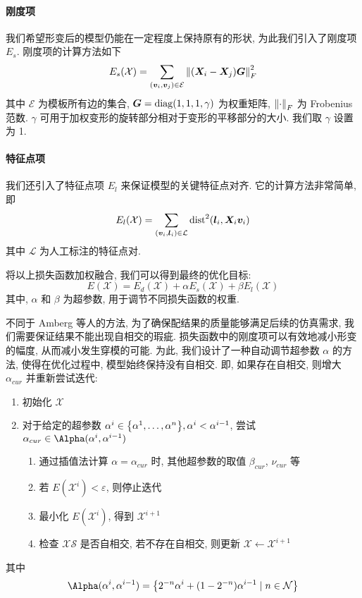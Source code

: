\paragraph{刚度项}
我们希望形变后的模型仍能在一定程度上保持原有的形状, 为此我们引入了刚度项 $E_s$. 刚度项的计算方法如下
\begin{equation}
  E_s(\mathcal{X}) = \sum_{(\bm{v}_i, \bm{v}_j) \in \mathcal{E}} \norm{(\bm{X}_i - \bm{X}_j) \bm{G}}_F^2
\end{equation}
其中 $\mathcal{E}$ 为模板所有边的集合, $\bm{G} = \operatorname{diag}(1, 1, 1, \gamma)$ 为权重矩阵, $\norm{\cdot}_F$ 为 Frobenius 范数.
$\gamma$ 可用于加权变形的旋转部分相对于变形的平移部分的大小.
我们取 $\gamma$ 设置为 1.

\paragraph{特征点项}
我们还引入了特征点项 $E_l$ 来保证模型的关键特征点对齐.
它的计算方法非常简单, 即
\begin{equation}
  E_l(\mathcal{X}) = \sum_{(\bm{v}_i, \bm{l}_i) \in \mathcal{L}} \operatorname{dist}^2(\bm{l}_i, \bm{X}_i \bm{v}_i)
\end{equation}
其中 $\mathcal{L}$ 为人工标注的特征点对.

将以上损失函数加权融合, 我们可以得到最终的优化目标:
\begin{equation}
  E(\mathcal{X}) = E_d(\mathcal{X}) + \alpha E_s(\mathcal{X}) + \beta E_l(\mathcal{X})
\end{equation}
其中, $\alpha$ 和 $\beta$ 为超参数, 用于调节不同损失函数的权重.

不同于 Amberg 等人的方法, 为了确保配结果的质量能够满足后续的仿真需求, 我们需要保证结果不能出现自相交的瑕疵.
损失函数中的刚度项可以有效地减小形变的幅度, 从而减小发生穿模的可能.
为此, 我们设计了一种自动调节超参数 $\alpha$ 的方法, 使得在优化过程中, 模型始终保持没有自相交.
即, 如果存在自相交, 则增大 $\alpha_{cur}$ 并重新尝试迭代:
\begin{enumerate}
  \item 初始化 $\mathcal{X}$
  \item 对于给定的超参数 $\alpha^i \in \Bqty{\alpha^1, \dots, \alpha^n}, \alpha^i < \alpha^{i - 1}$, 尝试 $\alpha_{cur} \in \Alpha(\alpha^i, \alpha^{i - 1})$
        \begin{enumerate}
          \item 通过插值法计算 $\alpha = \alpha_{cur}$ 时, 其他超参数的取值 $\beta_{cur}$, $\nu_{cur}$ 等
          \item 若 $E(\mathcal{X}^i) < \varepsilon$, 则停止迭代
          \item 最小化 $E(\mathcal{X}^i)$, 得到 $\mathcal{X}^{i + 1}$
          \item 检查 $\mathcal{X} \mathcal{S}$ 是否自相交, 若不存在自相交, 则更新 $\mathcal{X} \leftarrow \mathcal{X}^{i + 1}$
        \end{enumerate}
\end{enumerate}
其中
\begin{equation}
  \Alpha(\alpha^i, \alpha^{i - 1}) = \Bqty{2^{-n} \alpha^i + (1 - 2^{-n}) \alpha^{i - 1} \mid n \in \mathcal{N}}
\end{equation}

